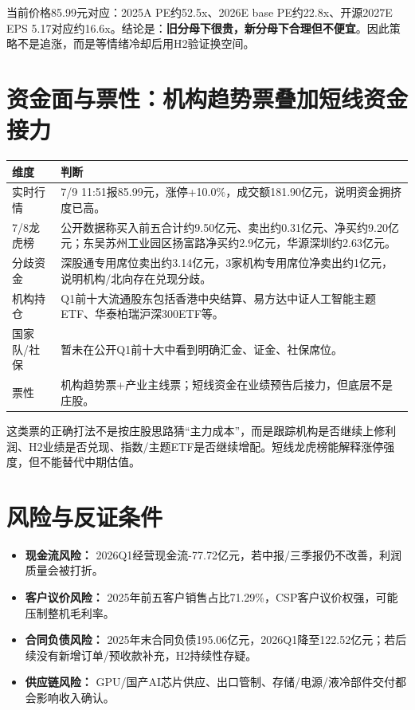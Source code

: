 \documentclass[a4paper,11pt,fontset=none]{ctexart}
\begin{document}
当前价格85.99元对应：2025A PE约52.5x、2026E base PE约22.8x、开源2027E EPS 5.17对应约16.6x。结论是：\textbf{旧分母下很贵，新分母下合理但不便宜}。因此策略不是追涨，而是等情绪冷却后用H2验证换空间。

\section{资金面与票性：机构趋势票叠加短线资金接力}

\noindent\begin{tabularx}{\textwidth}{L{3.4cm}X}
\toprule
\textbf{维度} & \textbf{判断} \\
\midrule
实时行情 & 7/9 11:51报85.99元，涨停+10.0\%，成交额181.90亿元，说明资金拥挤度已高。 \\
7/8龙虎榜 & 公开数据称买入前五合计约9.50亿元、卖出约0.31亿元、净买约9.20亿元；东吴苏州工业园区扬富路净买约2.9亿元，华源深圳约2.63亿元。 \\
分歧资金 & 深股通专用席位卖出约3.14亿元，3家机构专用席位净卖出约1亿元，说明机构/北向存在兑现分歧。 \\
机构持仓 & Q1前十大流通股东包括香港中央结算、易方达中证人工智能主题ETF、华泰柏瑞沪深300ETF等。 \\
国家队/社保 & 暂未在公开Q1前十大中看到明确汇金、证金、社保席位。 \\
票性 & 机构趋势票+产业主线票；短线资金在业绩预告后接力，但底层不是庄股。 \\
\bottomrule
\end{tabularx}

这类票的正确打法不是按庄股思路猜“主力成本”，而是跟踪机构是否继续上修利润、H2业绩是否兑现、指数/主题ETF是否继续增配。短线龙虎榜能解释涨停强度，但不能替代中期估值。

\section{风险与反证条件}

\begin{riskbox}[必须盯住的四个风险]
\begin{itemize}
  \item \textbf{现金流风险：} 2026Q1经营现金流-77.72亿元，若中报/三季报仍不改善，利润质量会被打折。
  \item \textbf{客户议价风险：} 2025年前五客户销售占比71.29\%，CSP客户议价权强，可能压制整机毛利率。
  \item \textbf{合同负债风险：} 2025年末合同负债195.06亿元，2026Q1降至122.52亿元；若后续没有新增订单/预收款补充，H2持续性存疑。
  \item \textbf{供应链风险：} GPU/国产AI芯片供应、出口管制、存储/电源/液冷部件交付都会影响收入确认。
\end{itemize}
\end{riskbox}
\end{document}
